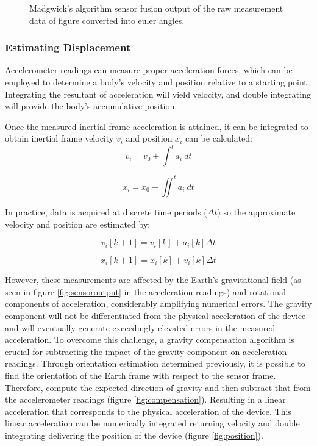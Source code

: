 \begin{figure}
    \centering
    \resizebox{0.8\linewidth}{!}{}
    \caption{Madgwick's algorithm sensor fusion output of the raw measurement data of figure converted into euler angles.}
    \label{fig:fusion_output_euler}
\end{figure}

\subsubsection{Estimating Displacement}

Accelerometer readings can measure proper acceleration forces, which can be employed to determine a body's velocity and position relative to a starting point. Integrating the resultant of acceleration will yield velocity, and double integrating will provide the body's accumulative position.

Once the measured inertial-frame acceleration is attained, it can be integrated to obtain inertial frame velocity $v_i$  and position $x_i$ can be calculated:
\begin{equation}
    v_i = v_0 +  \int^t a_i~dt
\end{equation}

\begin{equation}
    x_i = x_0 + \iint^t a_i~dt
\end{equation}

In practice, data is acquired at discrete time periods ($\Delta t$) so the approximate velocity and position are estimated by:

\begin{equation}
    v_i[k+1]= v_i[k]+a_i[k]\Delta t
\end{equation}

\begin{equation}
    x_i[k+1]= x_i[k]+v_i[k]\Delta t
\end{equation}

However, these measurements are affected by the Earth's gravitational field (as seen in figure \ref{fig:sensoroutput} in the acceleration readings) and rotational components of acceleration, considerably amplifying numerical errors. The gravity component will not be differentiated from the physical acceleration of the device and will eventually generate exceedingly elevated errors in the measured acceleration. To overcome this challenge, a gravity compensation algorithm is crucial for subtracting the impact of the gravity component on acceleration readings. Through orientation estimation determined previously, it is possible to find the orientation of the Earth frame with respect to the sensor frame. Therefore, compute the expected direction of gravity and then subtract that from the accelerometer readings (figure \ref{fig:compensation}). Resulting in a linear acceleration that corresponds to the physical acceleration of the device. This linear acceleration can be numerically integrated returning velocity and double integrating delivering the position of the device (figure \ref{fig:position}).

